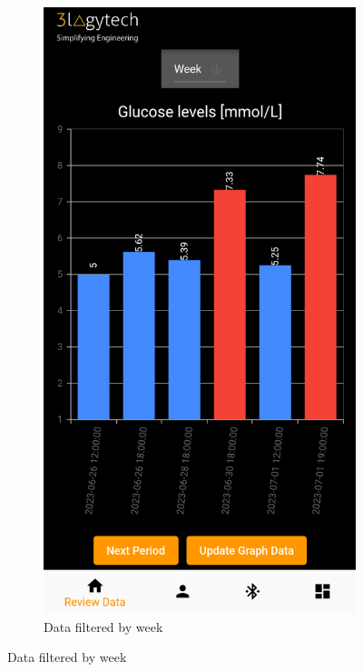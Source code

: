 \documentclass[a4paper]{scrreprt}
\begin{document}
\begin{figure}[h]
    \begin{subfigure}{0.45\textwidth}
        \centering
        \includegraphics[scale=0.47]{graph_week.png}
        \caption{Data filtered by week}
        \label{fig:graph4}
    \end{subfigure}
\end{figure}
\end{document}
